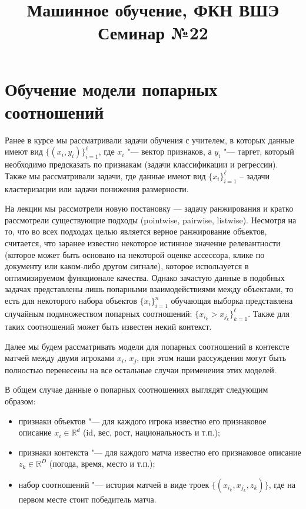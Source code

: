 \documentclass[12pt,a4paper]{article}
\title{Машинное обучение, ФКН ВШЭ\\Семинар №22}
\begin{document}
\author{}
\date{}
\maketitle

\section{Обучение модели попарных соотношений}

Ранее в курсе мы рассматривали задачи обучения с учителем, в которых данные имеют  вид $\{(x_i, y_i)\}_{i=1}^\ell$, где $x_i$ "--- вектор признаков, а $y_i$ "--- таргет, который необходимо предсказать по признакам (задачи классификации и регрессии). Также мы рассматривали задачи, где данные имеют вид $\{x_i\}_{i=1}^\ell$ – задачи кластеризации или задачи понижения размерности. 
\par На лекции мы рассмотрели новую постановку — задачу ранжирования и кратко рассмотрели существующие подходы (pointwise, pairwise, listwise). Несмотря на то, что во всех подходах целью является верное ранжирование объектов, считается, что заранее известно некоторое истинное значение релевантности (которое может быть основано на некоторой оценке ассессора, клике по документу или каком-либо другом сигнале), которое используется в оптимизируемом функционале качества. Однако зачастую данные в подобных задачах представлены лишь попарными взаимодействиями между объектами, то есть для некоторого набора объектов $\{x_i\}_{i=1}^n$ обучающая выборка представлена случайным подмножеством попарных соотношений: $\{ x_{i_k} > x_{j_k} \}_{k=1}^\ell$. Также для таких соотношений может быть известен некий контекст.
\par Далее мы будем рассматривать модели для попарных соотношений в контексте матчей между двумя игроками $x_i, \, x_j$, при этом наши рассуждения могут быть полностью перенесены на все остальные случаи применения этих моделей.

В общем случае данные о попарных соотношениях выглядят следующим образом: 
\begin{itemize}
	\item признаки объектов "--- для каждого игрока известно его признаковое описание $x_i \in \mathbb{R}^d$ (id, вес, рост, национальность и т.п.);
	\item признаки контекста "--- для каждого матча известно его признаковое описание $z_k \in \mathbb{R}^{D}$ (погода, время, место и т.п.);
	\item набор соотношений "--- история матчей в виде троек $\{ (x_{i_k}, x_{j_k}, z_k)\}$, где на первом месте стоит победитель матча.
\end{itemize} 
\newpage
\end{document}
